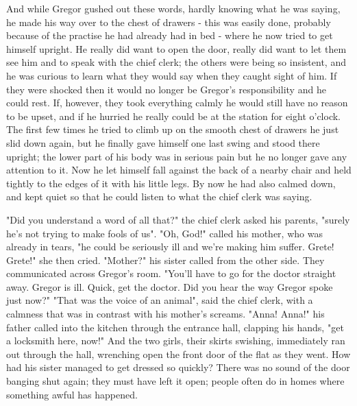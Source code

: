 \documentclass[12pt]{book}
\begin{document}
    And while Gregor gushed out these words, hardly knowing what he was saying, he made his way over to the chest of drawers - this was easily done, probably because of the practise he had already had in bed - where he now tried to get himself upright. He really did want to open the door, really did want to let them see him and to speak with the chief clerk; the others were being so insistent, and he was curious to learn what they would say when they caught sight of him. If they were shocked then it would no longer be Gregor's responsibility and he could rest. If, however, they took everything calmly he would still have no reason to be upset, and if he hurried he really could be at the station for eight o'clock. The first few times he tried to climb up on the smooth chest of drawers he just slid down again, but he finally gave himself one last swing and stood there upright; the lower part of his body was in serious pain but he no longer gave any attention to it. Now he let himself fall against the back of a nearby chair and held tightly to the edges of it with his little legs. By now he had also calmed down, and kept quiet so that he could listen to what the chief clerk was saying.

    "Did you understand a word of all that?" the chief clerk asked his parents, "surely he's not trying to make fools of us". "Oh, God!" called his mother, who was already in tears, "he could be seriously ill and we're making him suffer. Grete! Grete!" she then cried. "Mother?" his sister called from the other side. They communicated across Gregor's room. "You'll have to go for the doctor straight away. Gregor is ill. Quick, get the doctor. Did you hear the way Gregor spoke just now?" "That was the voice of an animal", said the chief clerk, with a calmness that was in contrast with his mother's screams. "Anna! Anna!" his father called into the kitchen through the entrance hall, clapping his hands, "get a locksmith here, now!" And the two girls, their skirts swishing, immediately ran out through the hall, wrenching open the front door of the flat as they went. How had his sister managed to get dressed so quickly? There was no sound of the door banging shut again; they must have left it open; people often do in homes where something awful has happened.
\end{document}

